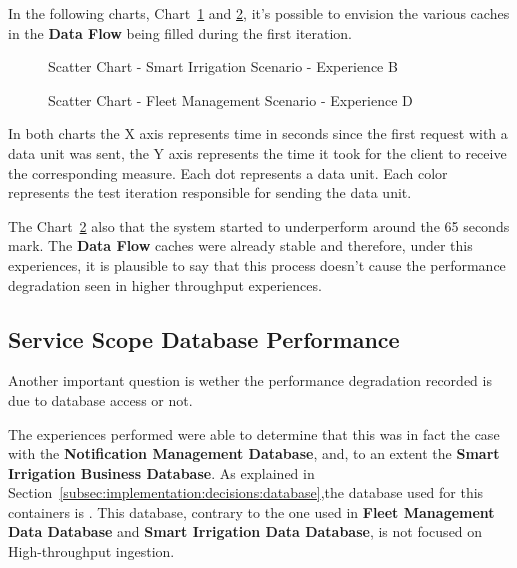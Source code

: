 In the following charts, Chart~\ref{fig:evaluation:overview:cache:chart:s2eB} and \ref{fig:evaluation:overview:cache:chart:s1eD}, it's possible to envision the various caches in the \textbf{Data Flow} being filled during the first iteration.

\begin{figure}[H]
    \centering
    
    \caption[Scatter Chart - Smart Irrigation Scenario - Experience B]{Scatter Chart - Smart Irrigation Scenario - Experience B}
    \label{fig:evaluation:overview:cache:chart:s2eB}
 \end{figure}

\begin{figure}[H]
    \centering
    
    \caption[Scatter Chart - Fleet Management Scenario - Experience D]{Scatter Chart - Fleet Management Scenario - Experience D}
    \label{fig:evaluation:overview:cache:chart:s1eD}
\end{figure}

In both charts the X axis represents time in seconds since the first request with a data unit was sent, the Y axis represents the time it took for the client to receive the corresponding measure. Each dot represents a data unit.
Each color represents the test iteration responsible for sending the data unit.

The Chart~\ref{fig:evaluation:overview:cache:chart:s1eD} also that the system started to underperform around the 65 seconds mark. The \textbf{Data Flow} caches were already stable and therefore, under this experiences, it is plausible to say that this process doesn't cause the performance degradation seen in higher throughput experiences.

\subsection{Service Scope Database Performance}
\label{subsec:evaluation:overview:servicedatabase}

Another important question is wether the performance degradation recorded is due to database access or not.

The experiences performed were able to determine that this was in fact the case with the \textbf{Notification Management Database}, and, to an extent the \textbf{Smart Irrigation Business Database}. As explained in Section~\ref{subsec:implementation:decisions:database},the database used for this containers is .
This database, contrary to the one used in \textbf{Fleet Management Data Database} and \textbf{Smart Irrigation Data Database}, is not focused on High-throughput ingestion.

